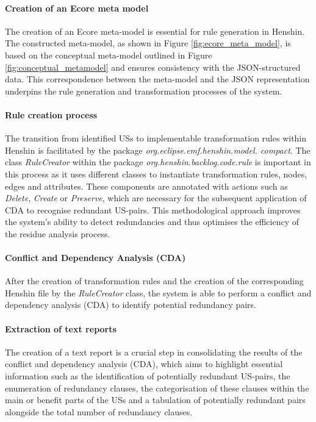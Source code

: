 \paragraph{Creation of an Ecore meta model}\label{workflow_ecore}
The creation of an Ecore meta-model is essential for rule generation in Henshin. The constructed meta-model, as shown in Figure \ref{fig:ecore_meta_model}, is based on the conceptual meta-model outlined in Figure \ref{fig:conceptual_metamodel} and ensures consistency with the JSON-structured data. This correspondence between the meta-model and the JSON representation underpins the rule generation and transformation processes of the system.

\paragraph{Rule creation process}\label{workflow_rule_creator}
The transition from identified USs to implementable transformation rules within Henshin is facilitated by the package \textit{org.eclipse.emf.henshin.model. compact}. The class \textit{RuleCreator} within the package \textit{org.henshin.backlog.code.rule} is important in this process as it uses different classes to instantiate transformation rules, nodes, edges and attributes. These components are annotated with actions such as \textit{Delete}, \textit{Create} or \textit{Preserve}, which are necessary  for the subsequent application of CDA to recognise redundant US-pairs. This methodological approach improves the system's ability to detect redundancies and thus optimises the efficiency of the residue analysis process.

\paragraph{Conflict and Dependency Analysis (CDA)} After the creation of transformation rules and the creation of the corresponding Henshin file by the \textit{RuleCreator} class, the system is able to perform a conflict and dependency analysis (CDA) to identify potential redundancy pairs.

\paragraph{Extraction of text reports} The creation of a text report is a crucial step in consolidating the results of the conflict and dependency analysis (CDA), which aims to highlight essential information such as the identification of potentially redundant US-pairs, the enumeration of redundancy clauses, the categorisation of these clauses within the main or benefit parts of the USs and a tabulation of potentially redundant pairs alongside the total number of redundancy clauses.\\\\

